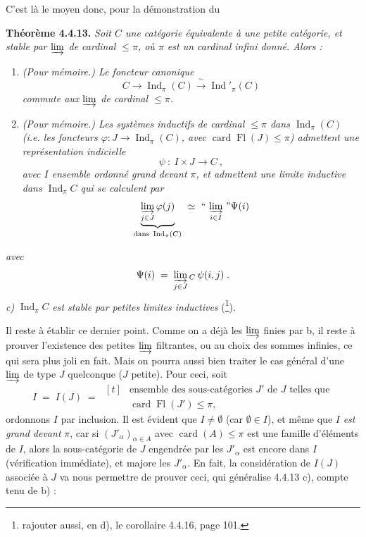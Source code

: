 \documentclass[11pt]{article}
\newcommand{\printedpage}[1]{\if\relax\detokenize{#1}\relax\else\marginpar{\footnotesize p.~#1}\fi}
\newcommand{\msp}[1]{\marginpar{\footnotesize [#1]}}
\newcommand{\card}{\operatorname{card}}
\newcommand{\Fl}{\operatorname{Fl}}
\newcommand{\Ind}{\operatorname{Ind}}
\begin{document}
C'est là le moyen donc, pour la démonstration du

\textbf{Théorème 4.4.13.} \textit{Soit $C$ une catégorie équivalente à une petite catégorie, et stable par $\varinjlim$ de cardinal $\leqslant \pi$, où $\pi$ est un cardinal infini donné. Alors :}
\msp{page 96}

\begin{enumerate}[label={}, leftmargin=*]
\item[\textit{a)}] \textit{(Pour mémoire.) Le foncteur canonique}
\[
C \longrightarrow \Ind_\pi(C) \xrightarrow{\ \sim\ } \Ind'_\pi(C)
\]
\textit{commute aux $\varinjlim$ de cardinal $\leqslant \pi$.}
\item[\textit{b)}] \textit{(Pour mémoire.) Les systèmes inductifs de cardinal $\leqslant \pi$ dans $\Ind_\pi(C)$ (i.e. les foncteurs $\varphi : J \longrightarrow \Ind_\pi(C)$, avec $\card \Fl(J) \leqslant \pi$) admettent une représentation indicielle}
\[
\psi \ :\ I \times J \longrightarrow C\ ,
\]
\textit{avec $I$ ensemble ordonné grand devant $\pi$, et admettent une limite inductive dans $\Ind_\pi C$ qui se calculent par}
\[
\underbrace{\varinjlim_{j\in J} \varphi(j)}_{\text{dans } \Ind_\pi(C)} \ \simeq\ \text{“}\,\varinjlim_{i\in I}\,\text{”}\Psi(i)
\]
\end{enumerate}

\printedpage{24}

\textit{avec}
\[
\Psi(i) \;=\; \varinjlim_{j\in J}{}_{C}\,\psi(i,j)\;.
\]
\textit{c)} $\Ind_\pi C$ \textit{est stable par petites limites inductives} (\footnote{rajouter aussi, en d), le corollaire 4.4.16, page 101.}).

Il reste à établir ce dernier point. Comme on a déjà les $\varinjlim$ finies par b, il reste à prouver l'existence des petites $\varinjlim$ filtrantes, ou au choix des sommes infinies, ce qui sera plus joli en fait. Mais
\msp{page 97}
on pourra aussi bien traiter le cas général d'une $\varinjlim$ de type $J$ quelconque ($J$ petite). Pour ceci, soit
\[
I \;=\; I(J) \;=\; \begin{aligned}[t]
&\text{ensemble des sous-catégories } J' \text{ de } J \text{ telles que}\\
&\card\Fl(J')\leqslant\pi,
\end{aligned}
\]
ordonnons $I$ par inclusion. Il est évident que $I\neq\emptyset$ (car $\emptyset\in I$), et même que $I$ \textit{est grand devant} $\pi$, car si $(J'_\alpha)_{\alpha\in A}$ avec $\card(A)\leqslant\pi$ est une famille d'éléments de $I$, alors la sous-catégorie de $J$ engendrée par les $J'_\alpha$ est encore dans $I$ (vérification immédiate), et majore les $J'_\alpha$. En fait, la considération de $I(J)$ associée à $J$ va nous permettre de prouver ceci, qui généralise 4.4.13 c), compte tenu de b) :
\end{document}
